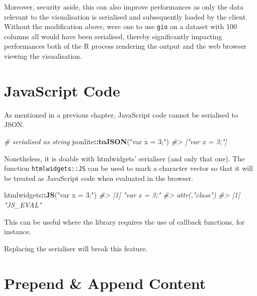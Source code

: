 \documentclass[
  10pt,
]{krantz}
\makeatletter
\newenvironment{Shaded}{\begin{snugshade}}{\end{snugshade}}
\newcommand{\CommentTok}[1]{\textcolor[rgb]{0.37,0.37,0.37}{\textit{#1}}}
\newcommand{\KeywordTok}[1]{\textcolor[rgb]{0.27,0.27,0.27}{\textbf{#1}}}
\newcommand{\NormalTok}[1]{#1}
\newcommand{\OperatorTok}[1]{\textcolor[rgb]{0.43,0.43,0.43}{\textbf{#1}}}
\newcommand{\StringTok}[1]{\textcolor[rgb]{0.5,0.5,0.5}{#1}}
\newenvironment{kframe}{%
\medskip{}
\setlength{\fboxsep}{.8em}
 \def\at@end@of@kframe{}%
 \ifinner\ifhmode%
  \def\at@end@of@kframe{\end{minipage}}%
  \begin{minipage}{\columnwidth}%
 \fi\fi%
 \def\FrameCommand##1{\hskip\@totalleftmargin \hskip-\fboxsep
 \colorbox{shadecolor}{##1}\hskip-\fboxsep
     \hskip-\linewidth \hskip-\@totalleftmargin \hskip\columnwidth}%
 \MakeFramed {\advance\hsize-\width
   \@totalleftmargin\z@ \linewidth\hsize
   \@setminipage}}%
 {\par\unskip\endMakeFramed%
 \at@end@of@kframe}
\renewenvironment{Shaded}{\begin{kframe}}{\end{kframe}}
\newenvironment{rmdblock}[1]
  {
  \begin{itemize}
  \renewcommand{\labelitemi}{
    \raisebox{-.7\height}[0pt][0pt]{
      {\setkeys{Gin}{width=3em,keepaspectratio}\texttt{[image: images/\#1]}}
    }
  }
  \setlength{\fboxsep}{1em}
  \begin{kframe}
  \item
  }
  {
  \end{kframe}
  \end{itemize}
  }
\newenvironment{rmdnote}
  {\begin{rmdblock}{note}}
  {\end{rmdblock}}
\makeatother
\begin{document}
Moreover, security aside, this can also improve performances as only the data relevant to the visualisation is serialised and subsequently loaded by the client. Without the modification above, were one to use \texttt{gio} on a dataset with 100 columns all would have been serialised, thereby significantly impacting performances both of the R process rendering the output and the web browser viewing the visualisation.

\hypertarget{widgets-adv-js}{%
\section{JavaScript Code}\label{widgets-adv-js}}

As mentioned in a previous chapter, JavaScript code cannot be serialised to JSON.

\begin{Shaded}
\begin{Highlighting}[]
\CommentTok{\# serialised as string}
\NormalTok{jsonlite}\OperatorTok{::}\KeywordTok{toJSON}\NormalTok{(}\StringTok{"var x = 3;"}\NormalTok{)}
\CommentTok{\#> ["var x = 3;"]}
\end{Highlighting}
\end{Shaded}

Nonetheless, it is doable with htmlwidgets' serialiser (and only that one). The function \texttt{htmlwidgets::JS} can be used to mark a character vector so that it will be treated as JavaScript code when evaluated in the browser.

\begin{Shaded}
\begin{Highlighting}[]
\NormalTok{htmlwidgets}\OperatorTok{::}\KeywordTok{JS}\NormalTok{(}\StringTok{"var x = 3;"}\NormalTok{)  }
\CommentTok{\#> [1] "var x = 3;"}
\CommentTok{\#> attr(,"class")}
\CommentTok{\#> [1] "JS\_EVAL"}
\end{Highlighting}
\end{Shaded}

This can be useful where the library requires the use of callback functions, for instance.

\begin{rmdnote}
Replacing the serialiser will break this feature.
\end{rmdnote}

\hypertarget{widgets-adv-prepend-append}{%
\section{Prepend \& Append Content}\label{widgets-adv-prepend-append}}
\end{document}
